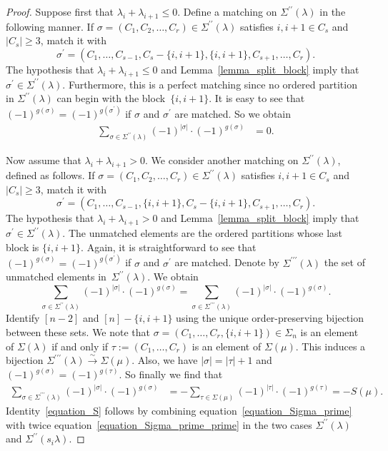 \documentclass[10pt]{amsart}
\theoremstyle{definition}
\newcommand{\fl}{\rightarrow}
\newcommand{\iso}{\stackrel{\sim}{\fl}}
\begin{document}
\begin{proof}
Suppose first that $\lambda_{i}+\lambda_{i+1}\leq 0$.
Define a matching on $\Sigma^{\prime\prime}(\lambda)$ in the following manner.
If $\sigma=(C_{1},C_{2},\ldots,C_{r}) \in \Sigma^{\prime\prime}(\lambda)$
satisfies
$i, i+1 \in C_{s}$ and $|C_{s}|\geq 3$, match it with
$$ \sigma^{\prime}
=
(C_{1},\ldots,C_{s-1},C_{s}-\{i,i+1\},\{i,i+1\},C_{s+1},\ldots,C_{r}) . $$
The hypothesis that $\lambda_{i}+\lambda_{i+1} \leq 0$
and Lemma~\ref{lemma_split_block}
imply that 
$\sigma^{\prime} \in \Sigma^{\prime\prime}(\lambda)$.
Furthermore, this is a perfect matching
since no ordered partition 
in $\Sigma^{\prime\prime}(\lambda)$
can begin with the block~$\{i,i+1\}$.
It is easy to see that 
$(-1)^{g(\sigma)}=(-1)^{g(\sigma^{\prime})}$ if $\sigma$ and $\sigma^{\prime}$ are matched.
So we obtain
\begin{align*}
\sum_{\sigma\in\Sigma^{\prime\prime}(\lambda)}
(-1)^{|\sigma|} \cdot (-1)^{g(\sigma)}
&=0.
\end{align*}


Now assume that $\lambda_{i}+\lambda_{i+1}>0$.
We consider another matching on $\Sigma^{\prime\prime}(\lambda)$, defined as follows.
If $\sigma=(C_{1}, C_{2}, \ldots, C_{r})\in\Sigma^{\prime\prime}(\lambda)$
satisfies $i, i+1 \in C_{s}$ and $|C_{s}| \geq 3$, match it with
$$ \sigma^{\prime}
= 
(C_{1},\ldots,C_{s-1},\{i,i+1\},C_{s}-\{i,i+1\},C_{s+1},\ldots,C_{r}). $$
The hypothesis that $\lambda_{i}+\lambda_{i+1} > 0$
and Lemma~\ref{lemma_split_block}
imply that 
$\sigma^{\prime} \in \Sigma^{\prime\prime}(\lambda)$.
The unmatched elements
are the ordered partitions whose last block is $\{i, i+1\}$.
Again, it is straightforward to see that 
$(-1)^{g(\sigma)}=(-1)^{g(\sigma^{\prime})}$ if $\sigma$ and $\sigma^{\prime}$ are matched.
Denote by $\Sigma^{\prime\prime\prime}(\lambda)$ the set of unmatched elements
in~$\Sigma^{\prime\prime}(\lambda)$.
We obtain
$$ \sum_{\sigma\in\Sigma^{\prime\prime}(\lambda)}
(-1)^{|\sigma|} \cdot (-1)^{g(\sigma)}
=
\sum_{\sigma\in\Sigma^{\prime\prime\prime}(\lambda)}
(-1)^{|\sigma|} \cdot (-1)^{g(\sigma)} . 
$$
Identify
$[n-2]$ and $[n]-\{i,i+1\}$
using the unique order-preserving bijection between these sets.
We note that
$\sigma=(C_{1}, \ldots, C_{r},\{i,i+1\})\in\Sigma_{n}$
is an element of $\Sigma(\lambda)$ if and only if
$\tau := (C_{1},\ldots,C_{r})$ is an element of $\Sigma(\mu)$.
This induces a bijection $\Sigma^{\prime\prime\prime}(\lambda)\iso\Sigma(\mu)$.
Also, we have $|\sigma|=|\tau|+1$ and $(-1)^{g(\sigma)}=(-1)^{g(\tau)}$.
So finally we find that
\begin{align*}
\sum_{\sigma\in\Sigma^{\prime\prime\prime}(\lambda)}
(-1)^{|\sigma|} \cdot (-1)^{g(\sigma)}
&=
-
\sum_{\tau\in\Sigma(\mu)}
(-1)^{|\tau|} \cdot (-1)^{g(\tau)}
=
-S(\mu).
\end{align*}
Identity~\eqref{equation_S}
follows by combining equation~\eqref{equation_Sigma_prime} 
with twice equation~\eqref{equation_Sigma_prime_prime}
in the two cases
$\Sigma^{\prime\prime}(\lambda)$ and $\Sigma^{\prime\prime}(s_{i} \lambda)$.



\end{proof}
\end{document}
